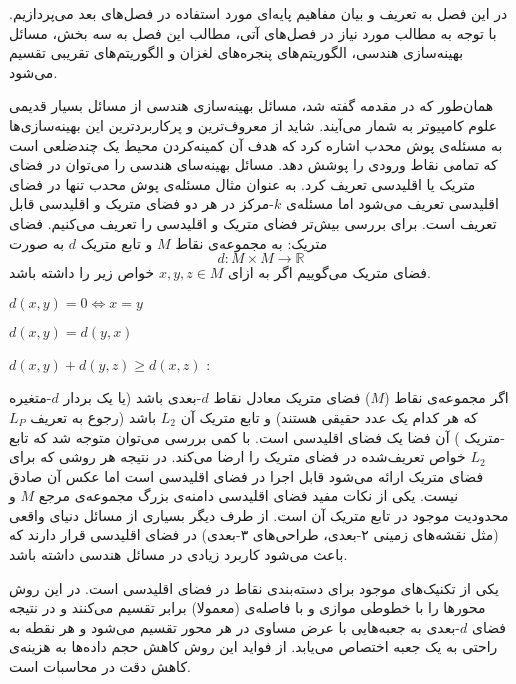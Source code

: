 

در این فصل به تعریف و بیان مفاهیم پایه‌ای مورد استفاده در فصل‌های بعد می‌پردازیم.
با توجه به مطالب مورد نیاز در فصل‌های آتی، مطالب این فصل به سه بخش، مسائل بهینه‌سازی هندسی، الگوریتم‌های پنجره‌های لغزان و الگوریتم‌های تقریبی تقسیم می‌شود.


همان‌طور که در مقدمه گفته شد، مسائل بهینه‌سازی هندسی از مسائل بسیار قدیمی علوم کامپیوتر به شمار می‌آیند. شاید از معروف‌ترین و پرکاربردترین این بهینه‌سازی‌ها به مسئله‌ی پوش محدب اشاره کرد که هدف آن کمینه‌کردن محیط یک چندضلعی است که تمامی نقاط ورودی را پوشش دهد. مسائل بهینه‌سای هندسی را می‌توان در فضای متریک یا اقلیدسی تعریف کرد. به عنوان مثال مسئله‌ی پوش محدب تنها در فضای اقلیدسی تعریف می‌شود اما مسئله‌ی $k$-مرکز در هر دو فضای متریک و اقلیدسی قابل تعریف است. برای بررسی بیش‌تر فضای متریک و اقلیدسی را تعریف می‌کنیم.
فضای متریک: به مجموعه‌ی نقاط $M$ و تابع متریک $d$ به صورت
$$ d: M \times M \to \mathbb{R}$$
  فضای متریک می‌گوییم اگر به ازای 
  $x, y, z \in M$
  خواص زیر را داشته باشد. 
\item{$ d(x,y) = 0 \iff x = y $}
\item{$ d(x,y) = d(y,x) $}
\item{$ d(x,y) + d(y,z) \ge d(x,z)$ : }

اگر مجموعه‌ی نقاط ($M$) فضای متریک معادل نقاط $d$-بعدی باشد (یا یک بردار $d$-متغیره که هر کدام یک عدد حقیقی هستند) و تابع متریک آن $L_2$ باشد (رجوع به تعریف $L_P$-متریک ) آن فضا یک فضای اقلیدسی است. 
با کمی بررسی می‌توان متوجه شد که تابع $L_2$ خواص تعریف‌شده در فضای متریک را ارضا می‌کند. در نتیجه هر روشی که برای فضای متریک ارائه می‌شود قابل اجرا در فضای اقلیدسی است اما عکس آن صادق نیست. یکی از نکات مفید فضای اقلیدسی دامنه‌ی بزرگ مجموعه‌‌ی مرجع $M$ و محدودیت موجود در تابع متریک آن است. از طرف دیگر بسیاری از مسائل دنیای واقعی (مثل نقشه‌های زمینی ۲-بعدی، طراحی‌های ۳-بعدی) در فضای اقلیدسی قرار دارند که باعث می‌شود کاربرد زیادی در مسائل هندسی داشته باشد.

یکی از تکنیک‌های موجود برای دسته‌بندی نقاط در فضای اقلیدسی  است. در این روش محورها را با خطوطی موازی و با فاصله‌ی (معمولا) برابر تقسیم می‌کنند و در نتیجه فضای $d$-بعدی به جعبه‌هایی با عرض مساوی در هر محور تقسیم می‌شود و هر نقطه به راحتی به یک جعبه اختصاص می‌یابد. از فواید این روش کاهش حجم داده‌ها به هزینه‌ی کاهش دقت در محاسبات است.

